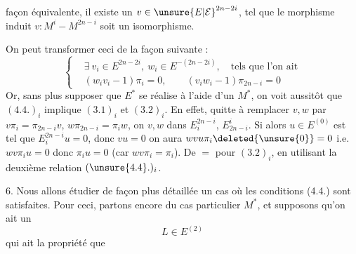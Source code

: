 
façon équivalente, il existe un $v\in \unsure{E|\mathcal E}^{2n-2i}$, tel que le morphisme induit $v:M^i- M^{2n-i}$ soit un isomorphisme.

On peut transformer ceci de la façon suivante :
\[
 \left\{\begin{aligned}
 &\exists\ v_i\in E^{2n-2i},\ w_i\in E^{-(2n-2i)},\quad\text{tels que l'on ait}\\
 &(w_i v_i-1)\pi_i=0,\qquad(v_i w_i-1)\pi_{2n-i}=0
 \end{aligned}\right.
 \tag*{$(4.4.)_i$}
\]
Or, sans plus supposer que $E^*$ se réalise à l'aide d'un $M^*$, on voit aussitôt que $(4.4.)_i$ implique $(3.1)_i$ et $(3.2)_i$. En effet, quitte à remplacer $v,w$ par $v\pi_i=\pi_{2n-i}v$, $w\pi_{2n-i}=\pi_i w$, on  $v,w$ dans $E_i^{2n-i}$, $E_{2n-i}^i$. Si alors  $u\in E^{(0)}$ est tel que $E_i^{2n-i}u=0$, donc $vu=0$ on aura $wvu\pi_i\deleted{\unsure{0}}=0$ i.e. $wv\pi_i u=0$ donc $\pi_i u=0$ (car $wv\pi_i=\pi_i$). De $=$ pour $(3.2)_i$, en utilisant la deuxième relation $(\unsure{4.4}.)_i$.


6. Nous allons étudier de façon plus détaillée un cas où les conditions (4.4.) sont satisfaites. Pour ceci, partons encore du cas particulier $M^*$,  et supposons qu'on ait un
\[
 L\in E^{(2)}
 \tag*{(6.0)}
\]
qui ait la propriété que
